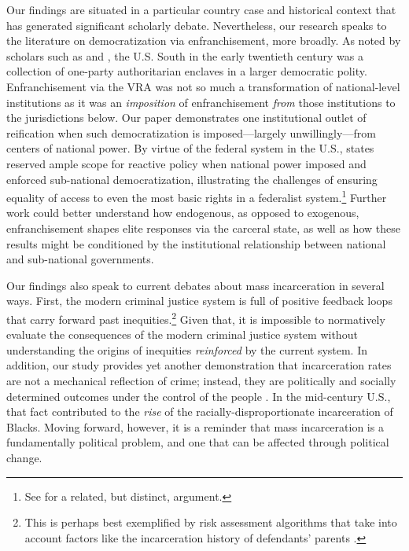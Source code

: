 \documentclass[12pt]{article}
\begin{document}
Our findings are situated in a particular country case and historical context that has generated significant scholarly debate.  Nevertheless, our research speaks to the literature on democratization via enfranchisement, more broadly. As noted by scholars such as \cite{KeyJr:1950ta} and \cite{Mickey:2015vh}, the U.S. South in the early twentieth century was a collection of one-party authoritarian enclaves in a larger democratic polity.  Enfranchisement via the VRA was not so much a transformation of national-level institutions as it was an \emph{imposition} of enfranchisement \emph{from} those institutions to the jurisdictions below.  Our paper demonstrates one institutional outlet of reification when such democratization is imposed---largely unwillingly---from centers of national power. By virtue of the federal system in the U.S., states reserved ample scope for reactive policy when national power imposed and enforced sub-national democratization, illustrating the challenges of ensuring equality of access to even the most basic rights in a federalist system.\footnote{See \cite{Miller:2008wb} for a related, but distinct, argument.} Further work could better understand how endogenous, as opposed to exogenous, enfranchisement shapes elite responses via the carceral state, as well as how these results might be conditioned by the institutional relationship between national and sub-national governments.

Our findings also speak to current debates about mass incarceration in several ways. First, the modern criminal justice system is full of positive feedback loops that carry forward past inequities.\footnote{This is perhaps best exemplified by risk assessment algorithms that take into account factors like the incarceration history of defendants' parents \citep{ProPublica2016}.} Given that, it is impossible to normatively evaluate the consequences of the modern criminal justice system without understanding the origins of inequities \emph{reinforced} by the current system.  In addition, our study provides yet another demonstration that incarceration rates are not a mechanical reflection of crime; instead, they are politically and socially determined outcomes under the control of the people \citep{Garland:1990uv}. In the mid-century U.S., that fact contributed to the \emph{rise} of the racially-disproportionate incarceration of Blacks. Moving forward, however, it is a reminder that mass incarceration is a fundamentally political problem, and one that can be affected through political change.





\singlespacing
\clearpage
\newpage










\end{document}
